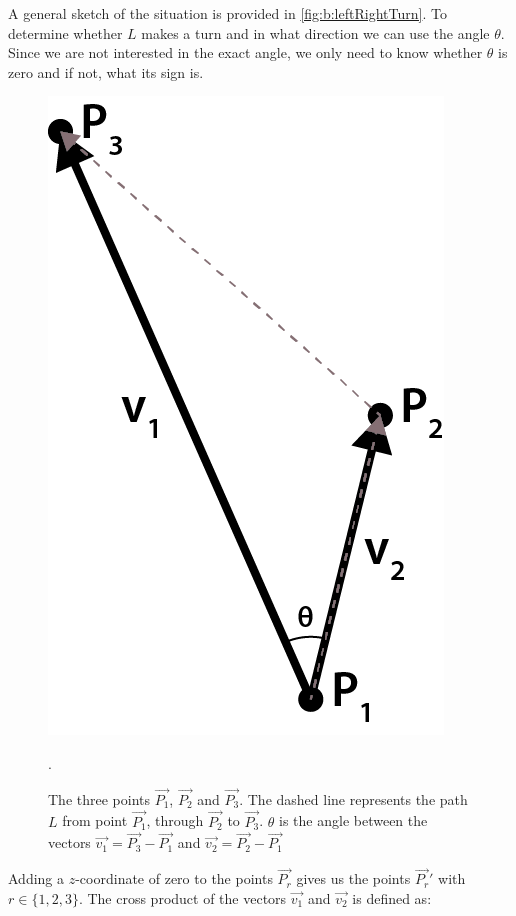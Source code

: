 A general sketch of the situation is provided in \autoref{fig:b:leftRightTurn}. To determine whether $L$ makes a turn and in what direction we can use the angle $\theta$. Since we are not interested in the exact angle, we only need to know whether $\theta$ is zero and if not, what its sign is. 

\begin{figure}
	\centering
	\includegraphics[scale=1]{./img/b_leftRightTurn}
	\caption{The three points $\vec{P_1}$, $\vec{P_2}$ and $\vec{P_3}$. The dashed line represents the path $L$ from point $\vec{P_1}$, through $\vec{P_2}$ to $\vec{P_3}$. $\theta$ is the angle between the vectors $\vec{v_1} = \vec{P_3} - \vec{P_1}$ and $\vec{v_2} = \vec{P_2} - \vec{P_1}$}.
	\label{fig:b:leftRightTurn}
\end{figure}

Adding a $z$-coordinate of zero to the points $\vec{P_r}$ gives us the points $\vec{P_r}'$ with $r \in \{1, 2, 3\}$. The cross product of the vectors $\vec{v_1}$ and $\vec{v_2}$ is defined as:

